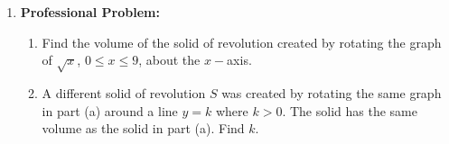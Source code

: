 \documentclass{article}
\begin{document}
\begin{enumerate}[label=\textbf{(8.\arabic*)}]
\newpage

\item \textbf{Professional Problem:}
\begin{enumerate}
\item Find the volume of the solid of revolution created by rotating the graph of $\sqrt{x}$, $0\le x\le9$, about the $x-$axis.
\item A different solid of revolution $S$ was created by rotating the same graph in part (a) around a line $y=k$ where $k>0$. The solid has the same volume as the solid in part (a). Find $k$.
\end{enumerate}


\end{enumerate}
\end{document}
